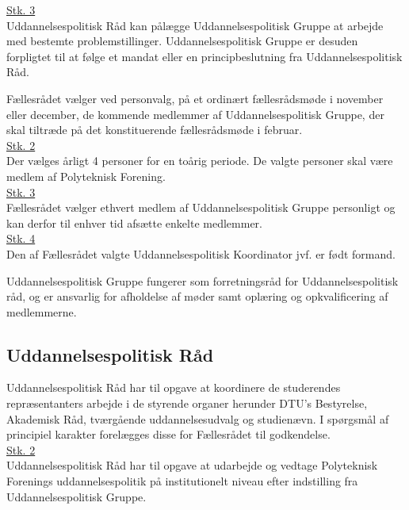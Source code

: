\begin{list}
\underline{Stk. 3}\\
Uddannelsespolitisk Råd kan pålægge Uddannelsespolitisk Gruppe at arbejde med bestemte problemstillinger. Uddannelsespolitisk Gruppe er desuden forpligtet til at følge et mandat eller en
principbeslutning fra Uddannelsespolitisk Råd.\\

\item Fællesrådet vælger ved personvalg, på et ordinært fællesrådsmøde i november eller december, de kommende medlemmer af Uddannelsespolitisk Gruppe, der skal tiltræde på det konstituerende fællesrådsmøde i februar.\\

\underline{Stk. 2}\\
Der vælges årligt 4 personer for en toårig periode. De valgte personer skal være medlem af Polyteknisk Forening.\\

\underline{Stk. 3}\\ Fællesrådet vælger ethvert medlem af Uddannelsespolitisk Gruppe personligt og kan derfor til enhver tid afsætte enkelte medlemmer.\\

\underline{Stk. 4}\\ 
Den af Fællesrådet valgte Uddannelsespolitisk Koordinator jvf.  er født formand.\\

\item Uddannelsespolitisk Gruppe fungerer som forretningsråd for Uddannelsespolitisk råd, og er ansvarlig for afholdelse af møder samt oplæring og opkvalificering af medlemmerne.\\

\subsection{Uddannelsespolitisk Råd}
\label{L:kap:upr}
\item Uddannelsespolitisk Råd har til opgave at koordinere de studerendes repræsentanters arbejde i de styrende organer herunder DTU’s Bestyrelse, Akademisk Råd, tværgående uddannelsesudvalg og studienævn. I spørgsmål af principiel karakter forelægges disse for Fællesrådet til godkendelse.\\

\underline{Stk. 2}\\
Uddannelsespolitisk Råd har til opgave at udarbejde og vedtage Polyteknisk Forenings uddannelsespolitik på institutionelt niveau efter indstilling fra Uddannelsespolitisk Gruppe.\\


\end{list}
